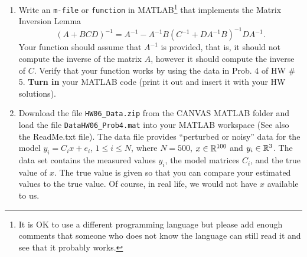 \documentclass[letterpaper]{article}
\begin{document}
\begin{enumerate}
\begin{enumerate}
 \item Use MATLAB to compute the e-values and e-vectors of $A_2$, and verify that they are $2,-1$, and thus distinct\footnote{If the e-values were repeated, you would find one e-vector, use it to build an orthonormal basis, and decompose $A_2$ to find $A_3$ symmetric that has dimension one less than $A_2$, etc.}. Find $U_2$ orthogonal such that
 $$U_2^\top A_2 U_2  $$
 is diagonal.  It is OK to use MATLAB for this.

 \item Define  the $3 \times 3$ matrix $U$ by
 $$ U =  \left[ \begin{array}{cc} 1 &0_{1\times 2} \\ 0_{2 \times 1} &U_2 \end{array} \right].$$
 Verify that $U$ is orthogonal.

 \item Define $O=V U$ and verify that $O$ is orthogonal.

 \item \textbf{This is the only part you turn in:} Report what you get when you compute $O^\top A O$. If it is not diagonal, you have done something wrong.

\end{enumerate}

\item Write an \texttt{m-file} or \texttt{function} in MATLAB\footnote{It is OK to use a different programming language but please add enough comments that someone who does not know the language can still read it and see that it probably works.} that implements the Matrix Inversion Lemma
    $$ (A + BCD)^{-1} = A^{-1} - A^{-1}B(C^{-1} + DA^{-1}B)^{-1}DA^{-1}.$$
    Your function should assume that $A^{-1}$ is provided, that is, it should not compute the inverse of the matrix $A$, however it should compute the inverse of $C$. Verify that your function works by using the data in Prob. 4 of HW \# 5. \textbf{Turn in} your MATLAB code (print it out and insert it with your HW solutions).

%
%

\item  Download the file \texttt{HW06\_Data.zip} from the CANVAS MATLAB folder and load the file \texttt{DataHW06\_Prob4.mat} into your MATLAB workspace (See also the ReadMe.txt file). The data file provides ``perturbed or noisy'' data for the model $y_i = C_i x + e_i$, $1 \le i \le N$, where $N=500$, $x\in \mathbb R^{100}$ and $y_i \in \mathbb R^3$. The data set contains the measured values $y_i$, the model matrices $C_i$, and the true value of $x$. The true value is given so that you can compare your estimated values to the true value. Of course, in real life, we would not have $x$ available to us. \\


\end{enumerate}
\end{document}
